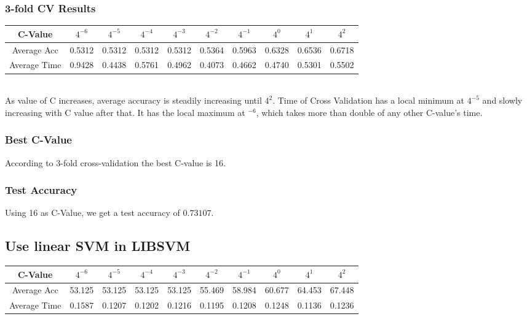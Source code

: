 \documentclass[letter,11pt]{article}
\begin{document}
\subsubsection{3-fold CV Results}
		\begin{tabular}{|c| c |c |c |c |c |c |c | c|c|} 
				\hline
				C-Value & $4^{-6}$ & $4^{-5}$ & $4^{-4}$ & $4^{-3}$ & $4^{-2}$ & $4^{-1}$ & $4^0$ & $4^1$ & $4^2$ \\ [0.5ex] 
				\hline
				Average Acc & 0.5312 & 0.5312 & 0.5312 & 0.5312 & 0.5364 & 0.5963 &  0.6328 &  0.6536 & 0.6718 \\ 
				\hline
				Average Time &  0.9428  & 0.4438 & 0.5761 & 0.4962 & 0.4073 & 0.4662 & 0.4740 & 0.5301 & 0.5502\\
				\hline
		\end{tabular}\\


	As value of C increases, average accuracy is steadily increasing until $4^2$. Time of Cross Validation has a local minimum at $4^{-5}$ and slowly increasing with C value after that. It has the local maximum at $^{-6}$, which takes more than double of any other C-value's time.

\subsubsection{Best C-Value}

	According to 3-fold cross-validation the best C-value is 16.
	
\subsubsection{Test Accuracy}
	
	Using 16 as C-Value, we get a test accuracy of $0.73107$.
	
\subsection{Use linear SVM in LIBSVM}
		\begin{tabular}{|c| c |c |c |c |c |c |c | c|c|} 
			\hline
			C-Value & $4^{-6}$ & $4^{-5}$ & $4^{-4}$ & $4^{-3}$ & $4^{-2}$ & $4^{-1}$ & $4^0$ & $4^1$ & $4^2$ \\ [0.5ex] 
			\hline
			Average Acc & 53.125 & 53.125 & 53.125 & 53.125 & 55.469 & 58.984 & 60.677 &  64.453 & 67.448 \\ 
			\hline
			Average Time &  0.1587  & 0.1207 & 0.1202 & 0.1216 & 0.1195 & 0.1208 & 0.1248 & 0.1136 & 0.1236\\
			\hline
		\end{tabular}\\
		
\end{document}
